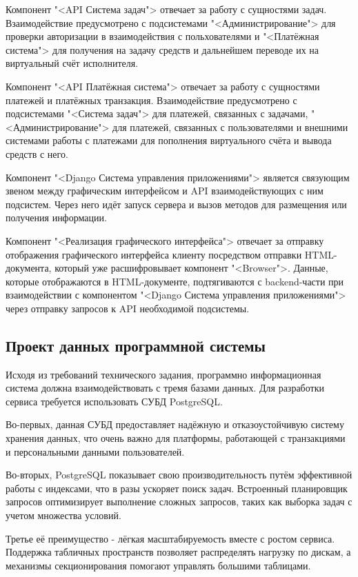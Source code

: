 Компонент "<API Система задач"> отвечает за работу с сущностями задач.  Взаимодействие предусмотрено с подсистемами "<Администрирование"> для проверки авторизации в взаимодействия с польхователями и "<Платёжная система"> для получения на задачу средств и дальнейшем переводе их на виртуальный счёт исполнителя.

Компонент "<API Платёжная система"> отвечает за работу с сущностями платежей и платёжных транзакция. Взаимодействие предусмотрено с подсистемами "<Система задач"> для платежей, связанных с задачами, "<Администрирование"> для платежей, связанных с пользователями и внешними системами работы с платежами для пополнения виртуального счёта и вывода средств с него.

Компонент "<Django Система управления приложениями"> является связующим звеном между графическим интерфейсом и API взаимодействующих с ним подсистем. Через него идёт запуск сервера и вызов методов для размещения или получения информации.

Компонент "<Реализация графического интерфейса"> отвечает за отправку отображения графического интерфейса клиенту посредством отправки HTML-документа, который уже расшифровывает компонент "<Browser">. Данные, которые отображаются в HTML-документе, подтягиваются с backend-части при взаимодействии с компонентом "<Django Система управления приложениями"> через отправку запросов к API необходимой подсистемы. 

\subsection{Проект данных программной системы}

Исходя из требований технического задания, программно информационная система должна взаимодействовать с тремя базами данных. Для разработки сервиса требуется использовать СУБД PostgreSQL.

Во-первых, данная СУБД предоставляет надёжную и отказоустойчивую систему хранения данных, что очень важно для платформы, работающей с транзакциями и персональными данными пользователей.

Во-вторых, PostgreSQL показывает свою производительность путём эффективной работы с индексами, что в разы ускоряет поиск задач. Встроенный планировщик запросов оптимизирует выполнение сложных запросов, таких как выборка задач с учетом множества условий.

Третье её преимущество - лёгкая масштабируемость вместе с ростом сервиса. Поддержка табличных пространств позволяет распределять нагрузку по дискам, а механизмы секционирования помогают управлять большими таблицами.


